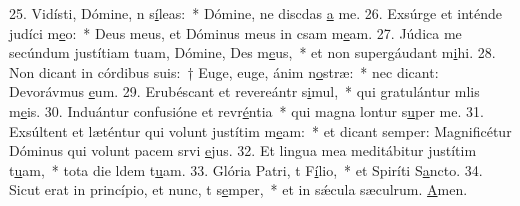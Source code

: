 25. Vidísti, Dómine, n s\uline{í}leas:~* Dómine, ne discdas \uline{a} me.
26. Exsúrge et inténde judíci m\uline{e}o:~* Deus meus, et Dóminus meus in csam m\uline{e}am.
27. Júdica me secúndum justítiam tuam, Dómine, Des m\uline{e}us,~* et non supergáudant m\uline{i}hi.
28. Non dicant in córdibus suis:~† Euge, euge, ánim n\uline{o}stræ:~* nec dicant: Devorávmus \uline{e}um.
29. Erubéscant et revereántr s\uline{i}mul,~* qui gratulántur mlis m\uline{e}is.
30. Induántur confusióne et revr\uline{é}ntia~* qui magna lontur s\uline{u}per me.
31. Exsúltent et læténtur qui volunt justítim m\uline{e}am:~* et dicant semper: Magnificétur Dóminus qui volunt pacem srvi \uline{e}jus.
32. Et lingua mea meditábitur justítim t\uline{u}am,~* tota die ldem t\uline{u}am.
33. Glória Patri, t F\uline{í}lio,~* et Spiríti S\uline{a}ncto.
34. Sicut erat in princípio, et nunc, t s\uline{e}mper,~* et in sǽcula sæculrum. \uline{A}men.
